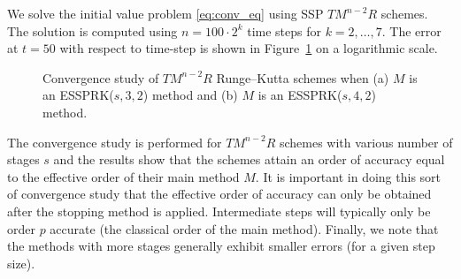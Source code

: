 We solve the initial value problem \eqref{eq:conv_eq}
using SSP $TM^{n-2}R$ schemes.
The solution is computed using $n = 100 \cdot 2^{k}$ time steps for
$k = 2, \dots, 7$.
The error at $t = 50$ with respect to time-step is shown in 
Figure~\ref{fig:conv_study} on a logarithmic scale.
\begin{figure}
	\centering
   \quad
    \caption{Convergence study of $TM^{n-2}R$ Runge--Kutta schemes when (a) $M$
    is an ESSPRK($s,3,2$) method and (b) $ M $ is an ESSPRK($s,4,2$) method.}
    \label{fig:conv_study}
\end{figure}
The convergence study is performed for $TM^{n-2}R$ schemes with
various number of stages $s$ and the results show that the schemes
attain an order of accuracy equal to the effective order of their main
method $M$.
It is important in doing this sort of convergence study that the
effective order of accuracy can only be obtained after the stopping method is
applied.
Intermediate steps will typically only be order $p$ accurate (the classical
order of the main method).
Finally, we note that the methods with more stages generally exhibit smaller errors
(for a given step size).

